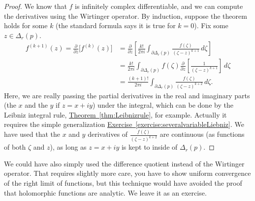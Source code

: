 \documentclass[12pt,openany]{book}
\theoremstyle{plain}
\theoremstyle{remark}
\theoremstyle{definition}
\theoremstyle{exercise}
\theoremstyle{example}
\newcommand{\exerciseref}[1]{\hyperref[#1]{Exercise~\ref*{#1}}}
\newcommand{\thmref}[1]{\hyperref[#1]{Theorem~\ref*{#1}}}
\begin{document}
\begin{proof}
We know that $f$ is infinitely complex differentiable, and we can compute
the derivatives using the Wirtinger operator.
By induction, suppose the theorem holds for some $k$
(the standard formula says it is true for $k=0$).  Fix some $z \in
\Delta_r(p)$.
\begin{equation*}
\begin{split}
f^{(k+1)}(z)
=
\frac{\partial }{\partial z}
\bigl[ f^{(k)}(z) \bigr]
& =
\frac{\partial }{\partial z}
\left[
\frac{k!}{2\pi i}
\int_{\partial \Delta_r(p)}
\frac{f(\zeta)}{(\zeta-z)^{k+1}}
\,
d \zeta
\right]
\\
& = 
\frac{k!}{2\pi i}
\int_{\partial \Delta_r(p)}
f(\zeta)
\frac{\partial }{\partial z}
\left[
\frac{1}{(\zeta-z)^{k+1}}
\right]
\,
d \zeta
\\
& = 
\frac{(k+1)!}{2\pi i}
\int_{\partial \Delta_r(p)}
\frac{f(\zeta)}{(\zeta-z)^{k+2}}
\,
d \zeta .
\end{split}
\end{equation*}
Here, we are really passing the partial derivatives in the real and
imaginary parts (the $x$ and the $y$ if $z=x+iy$) under the integral,
which can be done by 
the Leibniz integral rule, \thmref{thm:Leibnizrule}, for example.
Actually it requires the simple generalization \exerciseref{exercise:severalvariableLiebniz}.
We have used that the
$x$ and $y$ derivatives of 
$\frac{f(\zeta)}{(\zeta-z)^{k+2}}$ are continuous
(as functions of both $\zeta$ and $z$), as long as $z = x+iy$
is kept to
inside of $\Delta_r(p)$.
\end{proof}

We could have also simply used the difference quotient instead of the
Wirtinger operator.  That requires slightly more care, you have to show
uniform convergence of the right limit of functions, but this technique
would have avoided the proof that holomorphic functions are analytic.
We leave it as an exercise.
\end{document}

